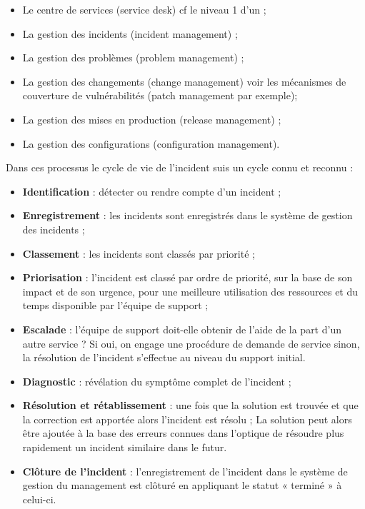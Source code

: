 \begin{itemize}
  \item Le centre de services (service desk) cf le niveau 1 d'un ;
  \item La gestion des incidents (incident management) ;
  \item La gestion des problèmes (problem management) ;
  \item La gestion des changements (change management) voir  les mécanismes de couverture de vulnérabilités (patch management par exemple);
  \item La gestion des mises en production (release management) ;
  \item La gestion des configurations (configuration management).
\end{itemize}

Dans ces processus le cycle de vie de l'incident suis un cycle connu et reconnu : 

\begin{itemize}
  \item \textbf{Identification} : détecter ou rendre compte d’un incident ;
  \item \textbf{Enregistrement} : les incidents sont enregistrés dans le système de gestion des incidents ;
  \item \textbf{Classement}  : les incidents sont classés par priorité ;
  \item \textbf{Priorisation} : l’incident est classé par ordre de priorité, sur la base de son impact et de son urgence, pour une meilleure utilisation des ressources et du temps disponible par l’équipe de support ;
  \item \textbf{Escalade}  : l’équipe de support doit-elle obtenir de l’aide de la part d’un autre service ? Si oui, on engage une procédure de demande de service sinon, la résolution de l'incident s’effectue au niveau du support initial.
  \item \textbf{Diagnostic}  : révélation du symptôme complet de l’incident ;
  \item \textbf{Résolution et rétablissement } : une fois que la solution est trouvée et que la correction est apportée alors l’incident est résolu ; La solution peut alors être ajoutée à la base des erreurs connues dans l'optique de résoudre plus rapidement un incident similaire dans le futur.
  \item \textbf{Clôture de l’incident}  : l’enregistrement de l’incident dans le système de gestion du management est clôturé en appliquant le statut « terminé » à celui-ci.
\end{itemize}

